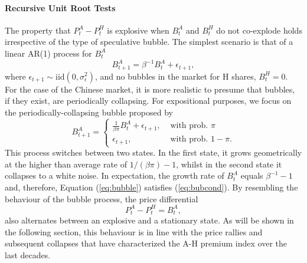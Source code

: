 \documentclass[11pt]{article}
\begin{document}
\paragraph{Recursive Unit Root Tests} The property that $P_t^A-P_t^H$ is explosive when $B_t^A$ and $B_t^H$ do not co-explode holds irrespective of the type of speculative bubble. The simplest scenario is that of a linear AR(1) process for $B_t^A$  
\begin{equation}
B_{t+1}^A=\beta^{-1}B_t^A+\epsilon_{t+1},
\end{equation} 
where $\epsilon_{t+1}\sim \text{iid} (0,\sigma_{\epsilon}^2)$, and no bubbles in the market for H shares, $B_t^H=0$. For the case of the Chinese market, it is more realistic to presume that bubbles, if they exist, are periodically collapsing. For expositional purposes, we focus on the periodically-collapsing bubble proposed by \citet{Blanchard1979} 
\begin{equation}  \label{eq:bubble}
B_{t+1}^A=\left\{
\begin{array}{cl}
\frac{1}{\beta\pi}B_{t}^A+\epsilon_{t+1}, & \text{ with prob. $\pi$}  \\
\epsilon_{t+1}, & \text{ with prob. $1-\pi$}.
\end{array}
\right.
\end{equation}
This process switches between two states. In the first state, it grows geometrically at the higher than average rate of $1/(\beta\pi)-1$, whilst in the second state it collapses to a white noise. In expectation, the growth rate of $B_t^A$  equals $\beta^{-1}-1$ and, therefore, Equation (\ref{eq:bubble}) satisfies (\ref{eq:bubcond}). By resembling the behaviour of the bubble process, the price differential
\begin{equation}\label{eq:pdiff_ongoing}
P_t^A-P_t^H=B_t^A,
\end{equation}
also alternates between an explosive and a stationary state. As will be shown in the following section, this behaviour is in line with the price rallies and subsequent collapses that have characterized the A-H premium index over the last decades.

\end{document}
